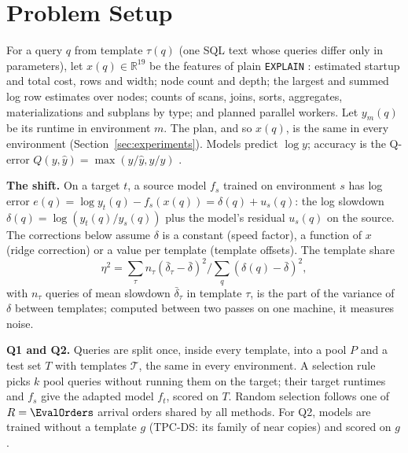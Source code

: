 \documentclass{article}
\begin{document}
\section{Problem Setup}
\label{sec:setup}
For a query $q$ from template $\tau(q)$ (one SQL text whose queries differ only in parameters), let $x(q)\in\mathbb{R}^{19}$ be the features of plain \texttt{EXPLAIN} \parencite{postgresExplain}: estimated startup and total cost, rows and width; node count and depth; the largest and summed log row estimates over nodes; counts of scans, joins, sorts, aggregates, materializations and subplans by type; and planned parallel workers. Let $y_m(q)$ be its runtime in environment $m$. The plan, and so $x(q)$, is the same in every environment (Section~\ref{sec:experiments}). Models predict $\log y$; accuracy is the Q-error $Q(y,\hat y)=\max(y/\hat y,\hat y/y)$ \parencite{moerkotte2009}.

\textbf{The shift.} On a target $t$, a source model $f_s$ trained on environment $s$ has log error $e(q)=\log y_t(q)-f_s(x(q))=\delta(q)+u_s(q)$: the log slowdown $\delta(q)=\log(y_t(q)/y_s(q))$ plus the model's residual $u_s(q)$ on the source. The corrections below assume $\delta$ is a constant (speed factor), a function of $x$ (ridge correction) or a value per template (template offsets). The template share
\begin{equation}
\eta^2=\textstyle\sum_{\tau} n_\tau(\bar\delta_\tau-\bar\delta)^2\big/\sum_q(\delta(q)-\bar\delta)^2,
\label{eq:share}
\end{equation}
with $n_\tau$ queries of mean slowdown $\bar\delta_\tau$ in template $\tau$, is the part of the variance of $\delta$ between templates; computed between two passes on one machine, it measures noise.

\textbf{Q1 and Q2.} Queries are split once, inside every template, into a pool $P$ and a test set $T$ with templates $\mathcal T$, the same in every environment. A selection rule picks $k$ pool queries without running them on the target; their target runtimes and $f_s$ give the adapted model $f_t$, scored on $T$. Random selection follows one of $R=\EvalOrders$ arrival orders shared by all methods. For Q2, models are trained without a template $g$ (TPC-DS: its family of near copies) and scored on $g$.
\end{document}
